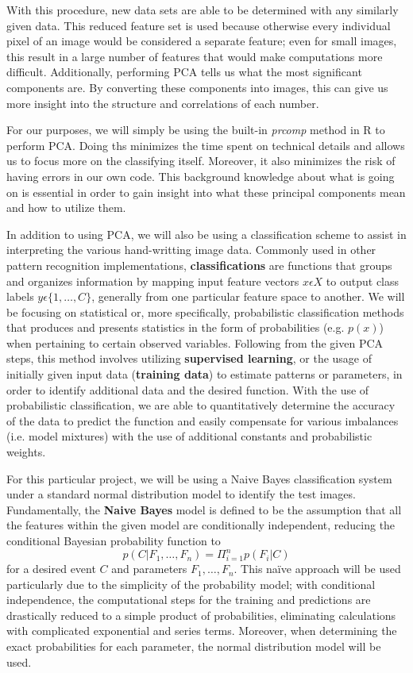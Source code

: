 \documentclass[twocolumn]{article}
\begin{document}
With this procedure, new data sets are able to be determined with any similarly given data. This reduced feature set is used because otherwise every individual pixel of an image would be considered a separate feature; even for small images, this result in a large number of features that would make computations more difficult. Additionally, performing PCA tells us what the most significant components are. By converting these components into images, this can give us more insight into the structure and correlations of each number.

For our purposes, we will simply be using the built-in \emph{prcomp} method in R to perform PCA. Doing ths minimizes the time spent on technical details and allows us to focus more on the classifying itself. Moreover, it also minimizes the risk of having errors in our own code. This background knowledge about what is going on is essential in order to gain insight into what these principal components mean and how to utilize them.

In addition to using PCA, we will also be using a classification scheme to assist in interpreting the various hand-writting image data. Commonly used in other pattern recognition implementations, \textbf{classifications} are functions that groups and organizes information by mapping input feature vectors $x \epsilon X$ to output class labels $y \epsilon \{1,\ldots, C\}$, generally from one particular feature space to another. We will be focusing on statistical or, more specifically, probabilistic classification methods that produces and presents statistics in the form of probabilities (e.g. $p(x)$) when pertaining to certain observed variables. Following from the given PCA steps, this method involves utilizing \textbf{supervised learning}, or the usage of initially given input data (\textbf{training data}) to estimate patterns or parameters, in order to identify additional data and the desired function. With the use of probabilistic classification, we are able to quantitatively determine the accuracy of the data to predict the function and easily compensate for various imbalances (i.e. model mixtures) with the use of additional constants and probabilistic weights.

For this particular project, we will be using a Naive Bayes classification system under a standard normal distribution model to identify the test images. Fundamentally, the \textbf{Naive Bayes} model is defined to be the assumption that all the features within the given model are conditionally independent, reducing the conditional Bayesian probability function to
$$p(C | F_1,\ldots, F_n) = \Pi_{i=1}^{n}p(F_i | C)$$
for a desired event $C$ and parameters $F_1,\ldots, F_n$. This naïve approach will be used particularly due to the simplicity of the probability model; with conditional independence, the computational steps for the training and predictions are drastically reduced to a simple product of probabilities, eliminating calculations with complicated exponential and series terms. Moreover, when determining the exact probabilities for each parameter, the normal distribution model will be used.
\end{document}
